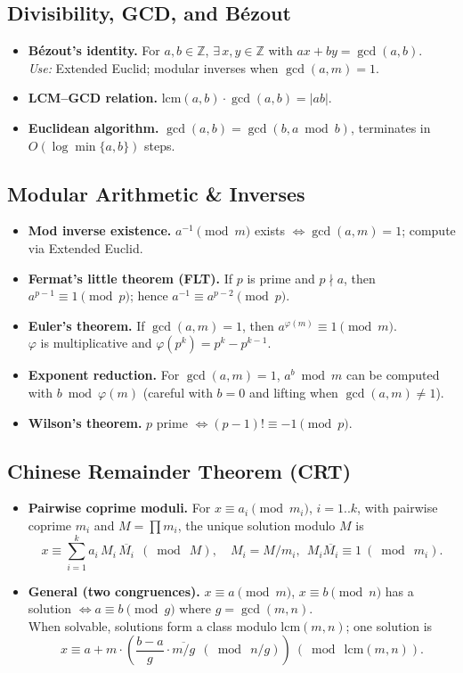 \documentclass[10pt]{article}
\theoremstyle{definition}
\begin{document}
\subsection{Divisibility, GCD, and Bézout}
\begin{itemize}
  \item \textbf{Bézout's identity.} For $a,b\in\mathbb{Z}$, $\exists\,x,y\in\mathbb{Z}$ with $ax+by=\gcd(a,b)$. \\
        \emph{Use:} Extended Euclid; modular inverses when $\gcd(a,m)=1$.
  \item \textbf{LCM--GCD relation.} $\mathrm{lcm}(a,b)\cdot \gcd(a,b)=|ab|$.
  \item \textbf{Euclidean algorithm.} $\gcd(a,b)=\gcd(b,a\bmod b)$, terminates in $O(\log\min\{a,b\})$ steps.
\end{itemize}

\subsection{Modular Arithmetic \& Inverses}
\begin{itemize}
  \item \textbf{Mod inverse existence.} $a^{-1}\pmod m$ exists $\iff \gcd(a,m)=1$; compute via Extended Euclid.
  \item \textbf{Fermat's little theorem (FLT).} If $p$ is prime and $p\nmid a$, then $a^{p-1}\equiv 1\pmod p$; hence $a^{-1}\equiv a^{p-2}\pmod p$.
  \item \textbf{Euler's theorem.} If $\gcd(a,m)=1$, then $a^{\varphi(m)}\equiv 1\pmod m$. \\
        $\varphi$ is multiplicative and $\varphi(p^k)=p^k-p^{k-1}$.
  \item \textbf{Exponent reduction.} For $\gcd(a,m)=1$, $a^b\bmod m$ can be computed with $b\bmod \varphi(m)$ (careful with $b=0$ and lifting when $\gcd(a,m)\ne 1$).
  \item \textbf{Wilson's theorem.} $p$ prime $\iff (p-1)!\equiv -1\pmod p$.
\end{itemize}

\subsection{Chinese Remainder Theorem (CRT)}
\begin{itemize}
  \item \textbf{Pairwise coprime moduli.} For $x\equiv a_i\pmod{m_i}$, $i=1..k$, with pairwise coprime $m_i$ and $M=\prod m_i$, the unique solution modulo $M$ is
  \[
    x \equiv \sum_{i=1}^k a_i\,M_i\,\overline{M_i}\ \ (\bmod\ M),\quad M_i=M/m_i,\ \ M_i\overline{M_i}\equiv 1\ (\bmod\ m_i).
  \]
  \item \textbf{General (two congruences).} $x\equiv a\pmod m$, $x\equiv b\pmod n$ has a solution $\iff a\equiv b\pmod{g}$ where $g=\gcd(m,n)$. \\
        When solvable, solutions form a class modulo $\mathrm{lcm}(m,n)$; one solution is
  \[
    x \equiv a + m\cdot \left( \frac{b-a}{g}\cdot \overline{m/g} \ \ (\bmod\ n/g) \right)\ (\bmod\ \mathrm{lcm}(m,n)).
  \]
\end{itemize}
\end{document}
